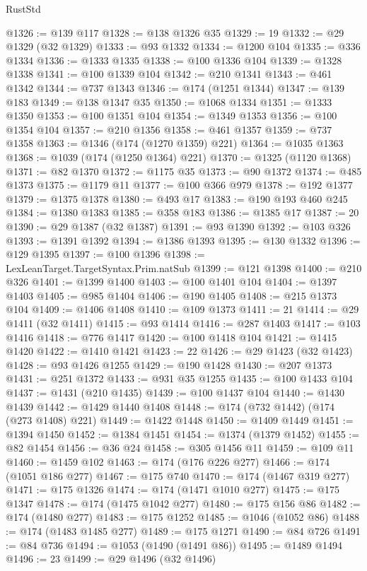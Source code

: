 \begin{lexlean}{RustStd}
\begin{coremodule}
{\begin{coremodule}
{{{{{{{{{{{{{{{{{{{{{{{{{{{{{{{{{{{{{{{{{{{{{{{{{{{{{{{@1326 := @139 @117
@1328 := @138 @1326 @35
@1329 := 19
@1332 := @29 @1329 (@32 @1329)
@1333 := @93 @1332
@1334 := @1200 @104
@1335 := @336 @1334
@1336 := @1333 @1335
@1338 := @100 @1336 @104
@1339 := @1328 @1338
@1341 := @100 @1339 @104
@1342 := @210 @1341
@1343 := @461 @1342
@1344 := @737 @1343
@1346 := @174 (@1251 @1344)
@1347 := @139 @183
@1349 := @138 @1347 @35
@1350 := @1068 @1334
@1351 := @1333 @1350
@1353 := @100 @1351 @104
@1354 := @1349 @1353
@1356 := @100 @1354 @104
@1357 := @210 @1356
@1358 := @461 @1357
@1359 := @737 @1358
@1363 := @1346 (@174 (@1270 @1359) @221)
@1364 := @1035 @1363
@1368 := @1039 (@174 (@1250 @1364) @221)
@1370 := @1325 (@1120 @1368)
@1371 := @82 @1370
@1372 := @1175 @35
@1373 := @90 @1372
@1374 := @485 @1373
@1375 := @1179 @11
@1377 := @100 @366 @979
@1378 := @192 @1377
@1379 := @1375 @1378
@1380 := @493 @17
@1383 := @190 @193 @460 @245
@1384 := @1380 @1383
@1385 := @358 @183
@1386 := @1385 @17
@1387 := 20
@1390 := @29 @1387 (@32 @1387)
@1391 := @93 @1390
@1392 := @103 @326
@1393 := @1391 @1392
@1394 := @1386 @1393
@1395 := @130 @1332
@1396 := @129 @1395
@1397 := @100 @1396
@1398 := LexLeanTarget.TargetSyntax.Prim.natSub
@1399 := @121 @1398
@1400 := @210 @326
@1401 := @1399 @1400
@1403 := @100 @1401 @104
@1404 := @1397 @1403
@1405 := @985 @1404
@1406 := @190 @1405
@1408 := @215 @1373 @104
@1409 := @1406 @1408
@1410 := @109 @1373
@1411 := 21
@1414 := @29 @1411 (@32 @1411)
@1415 := @93 @1414
@1416 := @287 @1403
@1417 := @103 @1416
@1418 := @776 @1417
@1420 := @100 @1418 @104
@1421 := @1415 @1420
@1422 := @1410 @1421
@1423 := 22
@1426 := @29 @1423 (@32 @1423)
@1428 := @93 @1426 @1255
@1429 := @190 @1428
@1430 := @207 @1373
@1431 := @251 @1372
@1433 := @931 @35 @1255
@1435 := @100 @1433 @104
@1437 := @1431 (@210 @1435)
@1439 := @100 @1437 @104
@1440 := @1430 @1439
@1442 := @1429 @1440 @1408
@1448 := @174 (@732 @1442) (@174 (@273 @1408) @221)
@1449 := @1422 @1448
@1450 := @1409 @1449
@1451 := @1394 @1450
@1452 := @1384 @1451
@1454 := @1374 (@1379 @1452)
@1455 := @82 @1454
@1456 := @36 @24
@1458 := @305 @1456 @11
@1459 := @109 @11
@1460 := @1459 @102
@1463 := @174 (@176 @226 @277)
@1466 := @174 (@1051 @186 @277)
@1467 := @175 @740
@1470 := @174 (@1467 @319 @277)
@1471 := @175 @1326
@1474 := @174 (@1471 @1010 @277)
@1475 := @175 @1347
@1478 := @174 (@1475 @1042 @277)
@1480 := @175 @156 @86
@1482 := @174 (@1480 @277)
@1483 := @175 @1252
@1485 := @1046 (@1052 @86)
@1488 := @174 (@1483 @1485 @277)
@1489 := @175 @1271
@1490 := @84 @726
@1491 := @84 @736
@1494 := @1053 (@1490 (@1491 @86))
@1495 := @1489 @1494
@1496 := 23
@1499 := @29 @1496 (@32 @1496)
}}}}}}}}}}}}}}}}}}}}}}}}}}}}}}}}}}}}}}}}}}}}}}}}}}}}}}}
\end{coremodule}}
\end{coremodule}
\end{lexlean}
